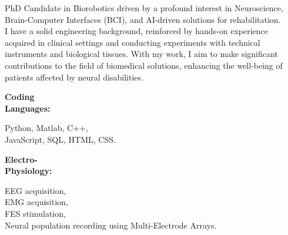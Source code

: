 \documentclass[9pt]{developercv} %
\begin{document}

\begin{minipage}[t]{0.55\textwidth}
	\vspace{-6pt}
 
    PhD Candidate in Biorobotics driven by a profound interest in Neuroscience, Brain-Computer Interfaces (BCI), and AI-driven solutions for rehabilitation.\\  
    I have a solid engineering background, reinforced by hands-on experience acquired in clinical settings and conducting experiments with technical instruments and biological tissues. With my work, I aim to make significant contributions to the field of biomedical solutions, enhancing the well-being of patients affected by neural disabilities.
	
\end{minipage}
\hfill %
\begin{minipage}[t]{0.405\textwidth}
    \vspace{-6pt}
    
    \begin{minipage}[t]{0.27\textwidth}
        \textbf{Coding \\ Languages:}
    \end{minipage}
    \hfill
    \begin{minipage}[t]{0.70\textwidth}
      Python, Matlab, C++, \\ JavaScript, SQL, HTML, CSS.
    \end{minipage}
    \vspace{4mm}
    
    \begin{minipage}[t]{0.27\textwidth}
        \textbf{Electro-\\ Physiology:}
    \end{minipage}
    \hfill
    \begin{minipage}[t]{0.70\textwidth}
      EEG acquisition,\\ EMG acquisition,\\ FES stimulation,\\ Neural population recording using Multi-Electrode Arrays.
    \end{minipage}
    
\end{minipage}
\end{document}
